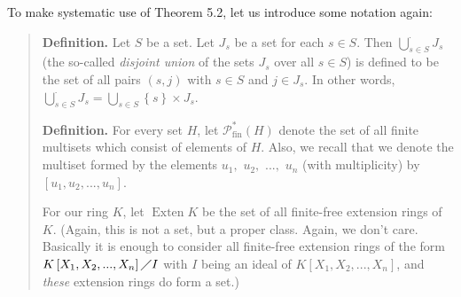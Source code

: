\documentclass[numbers=enddot,12pt,final,onecolumn,notitlepage]{scrartcl}%
\begin{document}
To make systematic use of Theorem 5.2, let us introduce some notation again:

\begin{quote}
\textbf{Definition.} Let $S$ be a set. Let $J_{s}$ be a set for each $s\in S$.
Then $\bigcup\limits_{s\in S}^{\cdot}J_{s}$ (the so-called \textit{disjoint
union} of the sets $J_{s}$ over all $s\in S$) is defined to be the set of all
pairs $\left(  s,j\right)  $ with $s\in S$ and $j\in J_{s}$. In other words,
$\bigcup\limits_{s\in S}^{\cdot}J_{s}=\bigcup\limits_{s\in S}\left\{
s\right\}  \times J_{s}$.

\textbf{Definition.} For every set $H$, let $\mathcal{P}_{\operatorname*{fin}%
}^{\ast}\left(  H\right)  $ denote the set of all finite multisets which
consist of elements of $H$. Also, we recall that we denote the multiset formed
by the elements $u_{1},$ $u_{2},$ $...,$ $u_{n}$ (with multiplicity) by
$\left[  u_{1},u_{2},...,u_{n}\right]  $.

For our ring $K$, let $\operatorname*{Exten}K$ be the set of all finite-free
extension rings of $K$. (Again, this is not a set, but a proper class. Again,
we don't care. Basically it is enough to consider all finite-free extension
rings of the form $K\left[  X_{1},X_{2},...,X_{n}\right]  \diagup I$ with $I$
being an ideal of $K\left[  X_{1},X_{2},...,X_{n}\right]  $, and
\textit{these} extension rings do form a set.)


\end{quote}
\end{document}
